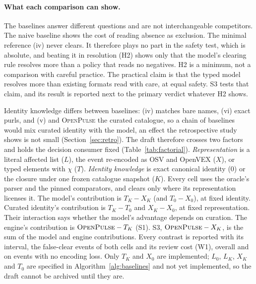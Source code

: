 \documentclass[11pt,a4paper]{article}
\newcommand{\op}{\textsc{OpenPulse}}
\begin{document}
\paragraph{What each comparison can show.} The baselines answer
different questions and are not interchangeable competitors. The
naive baseline shows the cost of reading absence as exclusion. The
minimal reference (iv) never clears. It therefore plays no part in the
safety test, which is absolute, and beating it in resolution (H2)
shows only that the model's clearing rule resolves more than a policy
that reads no negatives. H2 is a minimum, not a comparison with
careful practice. The practical claim is that the typed model resolves
more than existing formats read with care, at equal safety. S3 tests
that claim, and its result is reported next to the primary verdict
whatever H2 shows.

Identity knowledge differs between baselines: (iv) matches bare names,
(vi) exact purls, and (v) and \op{} the curated catalogue, so a chain
of baselines would mix curated identity with the model, an effect the
retrospective study shows is not small (Section~\ref{sec:retro}). The
draft therefore crosses two factors and holds
the decision consumer fixed (Table~\ref{tab:factorial}).
\emph{Representation} is a literal affected list ($L$), the event
re-encoded as OSV and OpenVEX ($X$), or typed elements with $\chi$
($T$). \emph{Identity knowledge} is exact canonical identity ($0$) or
the closure under one frozen catalogue snapshot ($K$). Every cell uses
the oracle's parser and the pinned comparators, and clears only where
its representation licenses it. The model's contribution is
$T_K - X_K$ (and $T_0 - X_0$), at fixed identity. Curated identity's
contribution is $T_K - T_0$ and $X_K - X_0$, at fixed representation.
Their interaction says whether the model's advantage depends on
curation. The engine's contribution is $\op{} - T_K$ (S1). S3,
$\op{} - X_K$, is the sum of the model and engine contributions. Every
contrast is reported with its interval, the false-clear events of both
cells and its review cost (W1), overall and on events with no encoding
loss. Only $T_K$ and $X_0$ are implemented; $L_0$, $L_K$, $X_K$ and
$T_0$ are specified in Algorithm~\ref{alg:baselines} and not yet
implemented, so the draft cannot be archived until they are.
\end{document}
